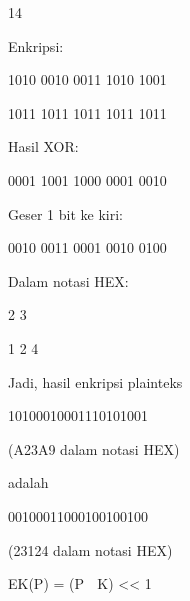 \documentclass{article}
\begin{document}

14

Enkripsi: 

1010  0010  0011  1010  1001 

1011  1011  1011  1011  1011  


Hasil XOR:  


0001  1001  1000  0001  0010     

Geser 1 bit ke kiri: 

0010  0011  0001  0010  0100  

Dalam notasi HEX: 

   2    3 

  1     2     4 

Jadi, hasil enkripsi plainteks  

10100010001110101001 

(A23A9 dalam notasi HEX) 


adalah 

00100011000100100100 

(23124 dalam notasi HEX) 

EK(P) = (P  K) << 1
\end{document}

